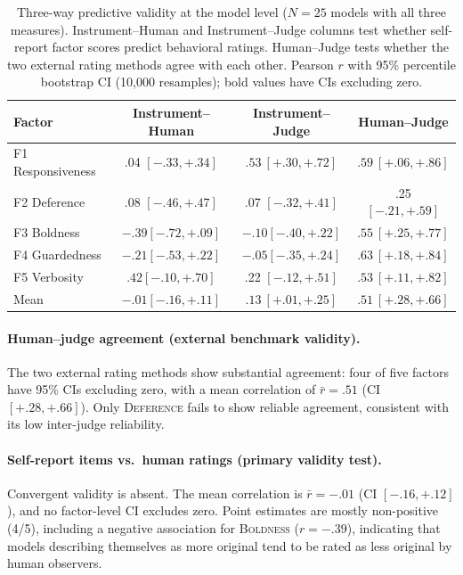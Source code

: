 \documentclass[11pt]{article}
\newcommand{\factorname}[1]{\textsc{#1}}
\begin{document}
\begin{table}[!htbp]
\centering
\caption{Three-way predictive validity at the model level ($N = 25$ models with all three measures). Instrument--Human and Instrument--Judge columns test whether self-report factor scores predict behavioral ratings. Human--Judge tests whether the two external rating methods agree with each other. Pearson $r$ with 95\% percentile bootstrap CI (10{,}000 resamples); bold values have CIs excluding zero.}
\label{tab:predictive}
\small
\begin{tabular}{@{}lccc@{}}
\toprule
Factor & Instrument--Human & Instrument--Judge & Human--Judge \\
\midrule
F1 Responsiveness &  .04 $[-.33, +.34]$               & $\mathbf{.53\ [+.30, +.72]}$     & $\mathbf{.59\ [+.06, +.86]}$ \\
F2 Deference      &  .08 $[-.46, +.47]$               &  .07 $[-.32, +.41]$              &  .25 $[-.21, +.59]$          \\
F3 Boldness       & $-.39 [-.72, +.09]$               & $-.10 [-.40, +.22]$              & $\mathbf{.55\ [+.25, +.77]}$ \\
F4 Guardedness    & $-.21 [-.53, +.22]$               & $-.05 [-.35, +.24]$              & $\mathbf{.63\ [+.18, +.84]}$ \\
F5 Verbosity      & $.42 [-.10, +.70]$                &  .22 $[-.12, +.51]$              & $\mathbf{.53\ [+.11, +.82]}$ \\
\midrule
Mean              & $-.01 [-.16, +.11]$               & $\mathbf{.13\ [+.01, +.25]}$     & $\mathbf{.51\ [+.28, +.66]}$ \\
\bottomrule
\end{tabular}
\end{table}

\paragraph{Human--judge agreement (external benchmark validity).}
The two external rating methods show substantial agreement: four of five factors have 95\% CIs excluding zero, with a mean correlation of $\bar{r} = .51$ (CI $[+.28, +.66]$). Only \factorname{Deference} fails to show reliable agreement, consistent with its low inter-judge reliability.

\paragraph{Self-report items vs.\ human ratings (primary validity test).}
Convergent validity is absent. The mean correlation is $\bar{r} = -.01$ (CI $[-.16, +.12]$), and no factor-level CI excludes zero. Point estimates are mostly non-positive (4/5), including a negative association for \factorname{Boldness} ($r = -.39$), indicating that models describing themselves as more original tend to be rated as less original by human observers.
\end{document}
